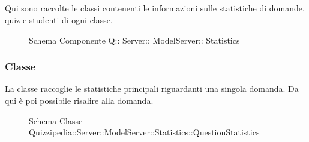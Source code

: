 \subsection{}
Qui sono raccolte le classi contenenti le informazioni sulle statistiche di domande, quiz e studenti di ogni classe.
\begin{figure}[H]
\centering
\noindent{}
\caption[Schema Componente Quizzipedia::Server::ModelServer::Statistics]{Schema Componente Q:: Server:: ModelServer:: Statistics}
\end{figure}
\subsubsection{Classe }
La classe raccoglie le statistiche principali riguardanti una singola domanda. Da qui è poi possibile risalire alla domanda.
\begin{figure}[H]
\centering
\noindent{}
\caption[Schema Classe QuestionStatistics]{Schema Classe Quizzipedia::Server::ModelServer::Statistics::QuestionStatistics}
\end{figure}
